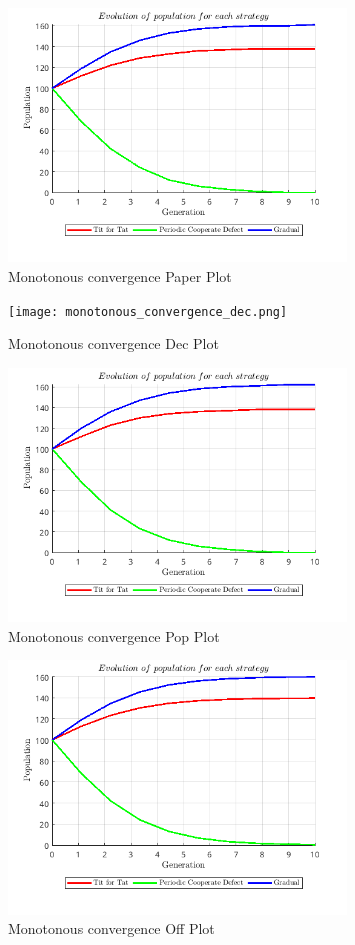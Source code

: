 \documentclass[12pt]{report}
\begin{document}
\begin{figure}[H]
    \centering
    \includegraphics[width=0.8\textwidth]{monotonous_convergence_paper.png}
    \caption{Monotonous convergence Paper Plot}
\end{figure}
\begin{figure}[H]
    \centering
    \texttt{[image: monotonous\_convergence\_dec.png]}
    \caption{Monotonous convergence Dec Plot}
\end{figure}
\begin{figure}[H]
    \centering
    \includegraphics[width=0.8\textwidth]{monotonous_convergence_pop.png}
    \caption{Monotonous convergence Pop Plot}
\end{figure}
\begin{figure}[H]
    \centering
    \includegraphics[width=0.8\textwidth]{monotonous_convergence_off.png}
    \caption{Monotonous convergence Off Plot}
\end{figure}
\end{document}
